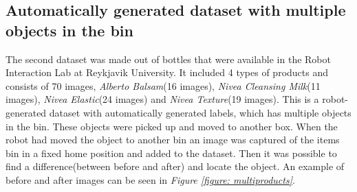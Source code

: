 \subsection{Automatically generated dataset with multiple objects in the bin} \label{sec:multidataset}
The second dataset was made out of bottles that were available in the Robot Interaction Lab at Reykjavik University. It included 4 types of products and consists of 70 images, \textit{Alberto Balsam}(16 images), \textit{Nivea Cleansing Milk}(11 images), \textit{Nivea Elastic}(24 images) and \textit{Nivea Texture}(19 images). 
This is a robot-generated dataset with automatically generated labels, which has multiple objects in the bin. 
These objects were picked up and moved to another box. When the robot had moved the object to another bin an image was captured of the items bin in a fixed home position and added to the dataset. Then it was possible to find a difference(between before and after) and locate the object.
An example of before and after images can be seen in \textit{Figure \ref{figure: multiproducts}}. 

